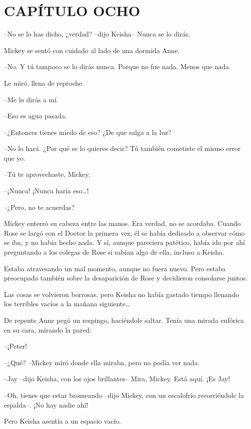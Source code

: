 \chapter*{CAPÍTULO OCHO}

{--No se lo has dicho, ¿verdad? --dijo Keisha-- Nunca se lo dirás.}

{Mickey se sentó con cuidado al lado de una dormida Anne.}

{--No. Y tú tampoco se lo dirás nunca. Porque no fue nada. Menos que
nada.}

{Le miró, llena de reproche.}

{--Me lo dirás a mí.}

{--Eso es agua pasada.}

{--¿Entonces tienes miedo de eso? ¿De que salga a la luz?}

{--No lo hará. ¿Por qué se lo quieres decir? Tú también cometiste el
mismo error que yo.}

{--Tú te aprovechaste, Mickey.}

{--¡Nunca! ¡Nunca haría eso\ldots{}!}

{--¿Pero, no te acuerdas?}

{Mickey enterró su cabeza entre las manos. Era verdad, no se acordaba.
 Cuando Rose se largó con el Doctor la primera vez, él se había dedicado
 a observar cómo se iba, y no había hecho nada. Y sí, aunque pareciera
 patético, había ido por ahí preguntando a los colegas de Rose si sabían
algo de ella, incluso a Keisha.}

{Estaba atravesando un mal momento, aunque no fuera nuevo. Pero estaba
 preocupada también sobre la desaparición de Rose y decidieron consolarse
juntos.}

{Las cosas se volvieron borrosas, pero Keisha no había gastado tiempo
 llenando los terribles vacíos a la mañana siguiente\ldots{}}

{De repente Anne pegó un respingo, haciéndole saltar. Tenía una mirada
eufórica en su cara, mirando la pared:}

{--¡Peter!}

{--¿Qué? --Mickey miró donde ella miraba, pero no podía ver nada.}

{--Jay --dijo Keisha, con los ojos brillantes-- Mira, Mickey. Está aquí.
¡Es Jay!}

{--Oh, tienes que estar bromeando --dijo Mickey, con un escalofrío
recorriéndole la espalda--. ¡No hay nadie ahí!}

{Pero Keisha asentía a un espacio vacío.}

